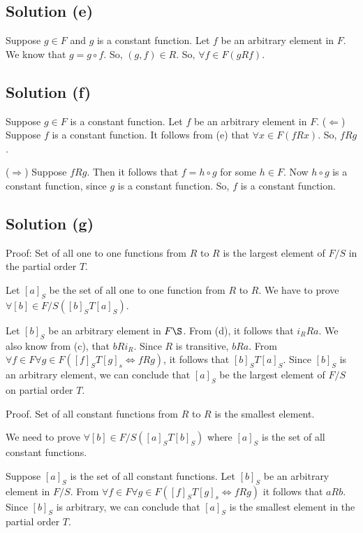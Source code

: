 \documentclass{article}
\begin{document}
\subsection{Solution (e)}
Suppose $g \in F$ and $g$ is a constant function. Let $f$ be an
arbitrary element in $F$. We know that $g = g \circ f$. So, $(g,f) \in
R$. So, $\forall f \in F(gRf)$.

\subsection{Solution (f)}
Suppose $g \in F$ is a constant function. Let $f$ be an arbitrary
element in $F$.
($\Leftarrow$) Suppose $f$ is a constant function. It follows from (e)
that $\forall x \in F(fRx)$. So, $fRg$.

($\Rightarrow$) Suppose $fRg$. Then it follows that $f = h \circ g$
for some $h \in F$. Now $h \circ g$ is a constant function, since $g$
is a constant function. So, $f$ is a constant function.

\subsection{Solution (g)}
Proof: Set of all one to one functions from $R$ to $R$ is the largest
element of $F/S$ in the partial order $T$.

Let $[a]_S$ be the set of all one to one function from $R$ to $R$. We
have to prove $\forall [b] \in F/S ([b]_S T [a]_S)$.

Let $[b]_S$ be an arbitrary element in $F\S$. From (d), it follows
that $i_RRa$. We also know from (c), that $bRi_R$. Since $R$ is
transitive, $bRa$. From $\forall f \in F \forall g \in F([f]_S T [g]_s
\iff fRg)$, it follows that $[b]_S T [a]_S$. Since $[b]_S$ is an
arbitrary element, we can conclude that $[a]_S$ be the largest element
of $F/S$ on partial order $T$.

Proof. Set of all constant functions from $R$ to $R$ is the smallest
element.

We need to prove $\forall [b] \in F/S([a]_S T [b]_S)$ where $[a]_S$ is
the set of all constant functions.

Suppose $[a]_S$ is the set of all constant functions. Let $[b]_S$ be
an arbitrary element in $F/S$. From
$\forall f \in F \forall g \in F([f]_S T [g]_s \iff fRg)$ it follows
that $aRb$. Since $[b]_S$ is arbitrary, we can conclude that $[a]_S$
is the smallest element in the partial order $T$.
\end{document}
